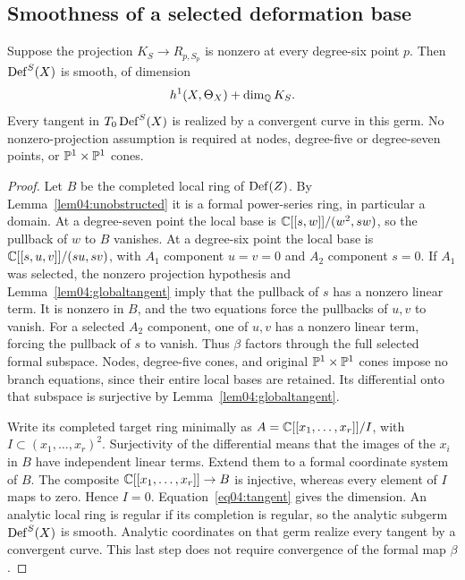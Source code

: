 \subsection{Smoothness of a selected deformation base}

\begin{theorem}\label{thm04:smoothbase}
Suppose the projection $K_S\to R_{p,S_p}$ is nonzero at every
degree-six point $p$.  Then $\operatorname{Def}^S(X)$ is smooth, of dimension
\[
 h^1(X,\Theta_X)+\dim_{\mathbb{Q}}K_S.
\]
Every tangent in $T_0\operatorname{Def}^S(X)$ is realized by a convergent curve in
this germ.  No nonzero-projection assumption is required at nodes,
degree-five or degree-seven points, or $\mathbb{P}^1\times\mathbb{P}^1$ cones.
\end{theorem}

\begin{proof}
Let $B$ be the completed local ring of $\operatorname{Def}(Z)$.  By
Lemma~\ref{lem04:unobstructed} it is a formal power-series ring, in
particular a domain.  At a degree-seven point the local base is
$\mathbb{C}[[s,w]]/(w^2,sw)$, so the pullback of $w$ to $B$ vanishes.
At a degree-six point the local base is
$\mathbb{C}[[s,u,v]]/(su,sv)$, with $A_1$ component $u=v=0$ and
$A_2$ component $s=0$.  If $A_1$ was selected, the nonzero
projection hypothesis and Lemma~\ref{lem04:globaltangent} imply
that the pullback of $s$ has a nonzero linear term.  It is nonzero in
$B$, and the two equations force the pullbacks of $u,v$ to vanish.
For a selected $A_2$ component, one of $u,v$ has a nonzero linear
term, forcing the pullback of $s$ to vanish.  Thus $\beta$ factors
through the full selected formal subspace.  Nodes, degree-five
cones, and original $\mathbb{P}^1\times\mathbb{P}^1$ cones impose no branch equations, since their
entire local bases are retained.  Its differential onto
that subspace is surjective by Lemma~\ref{lem04:globaltangent}.

Write its completed target ring minimally as
$A=\mathbb{C}[[x_1,\ldots,x_r]]/I$, with $I\subset(x_1,\ldots,x_r)^2$.
Surjectivity of the differential means that the images of the $x_i$
in $B$ have independent linear terms.  Extend them to a formal
coordinate system of $B$.  The composite
$\mathbb{C}[[x_1,\ldots,x_r]]\to B$ is injective, whereas every element
of $I$ maps to zero.  Hence $I=0$.  Equation~\eqref{eq04:tangent}
gives the dimension.  An analytic local ring is regular if its
completion is regular, so the analytic subgerm $\operatorname{Def}^S(X)$ is
smooth.  Analytic coordinates on that germ realize every tangent by
a convergent curve.  This last step does not require convergence of
the formal map $\beta$.
\end{proof}

